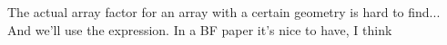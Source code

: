 \label{ap:c}

The actual array factor for an array with a certain geometry is hard to find... And we'll use the expression. In a BF paper it's nice to have, I think